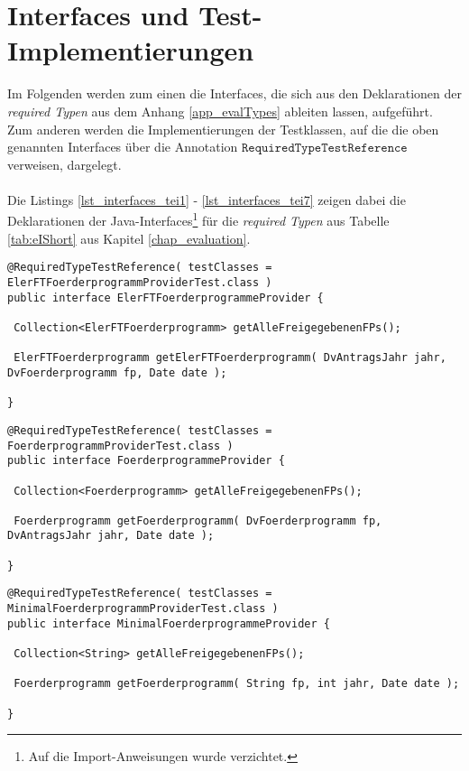 \chapter{Interfaces und Test-Implementierungen}\label{app_interfacesAndTests}
Im Folgenden werden zum einen die \Gls{Interface}s, die sich aus den Deklarationen der \emph{required Typen} aus dem Anhang \ref{app_evalTypes} ableiten lassen, aufgeführt. Zum anderen werden die Implementierungen der Testklassen, auf die die oben genannten \Gls{Interface}s über die Annotation $\texttt{RequiredTypeTestReference}$ verweisen, dargelegt. 
\\\\
Die Listings \ref{lst_interfaces_tei1} - \ref{lst_interfaces_tei7} zeigen dabei die Deklarationen der Java-Interfaces\footnote{Auf die Import-Anweisungen wurde verzichtet.} für die \emph{required Typen} aus Tabelle \ref{tab:eIShort} aus Kapitel \ref{chap_evaluation}.
\begin{lstlisting}[style = java, caption = Interface ElerFTFoerderprogrammeProvider, captionpos = b, label = lst_interfaces_tei1]
@RequiredTypeTestReference( testClasses = ElerFTFoerderprogrammProviderTest.class )
public interface ElerFTFoerderprogrammeProvider {

 Collection<ElerFTFoerderprogramm> getAlleFreigegebenenFPs();
 
 ElerFTFoerderprogramm getElerFTFoerderprogramm( DvAntragsJahr jahr, DvFoerderprogramm fp, Date date );
  
}
\end{lstlisting}
\pagebreak
\begin{lstlisting}[style = java, caption = Interface FoerderprogrammeProvider, captionpos = b, label = lst_interfaces_tei2]
@RequiredTypeTestReference( testClasses = FoerderprogrammProviderTest.class )
public interface FoerderprogrammeProvider {

 Collection<Foerderprogramm> getAlleFreigegebenenFPs();
 
 Foerderprogramm getFoerderprogramm( DvFoerderprogramm fp, DvAntragsJahr jahr, Date date );
   
}
\end{lstlisting}
\begin{lstlisting}[style = java, caption = Interface MinimalFoerderprogrammeProvider, captionpos = b, label = lst_interfaces_tei3]
@RequiredTypeTestReference( testClasses = MinimalFoerderprogrammProviderTest.class )
public interface MinimalFoerderprogrammeProvider {

 Collection<String> getAlleFreigegebenenFPs();

 Foerderprogramm getFoerderprogramm( String fp, int jahr, Date date );
  
}
\end{lstlisting}
